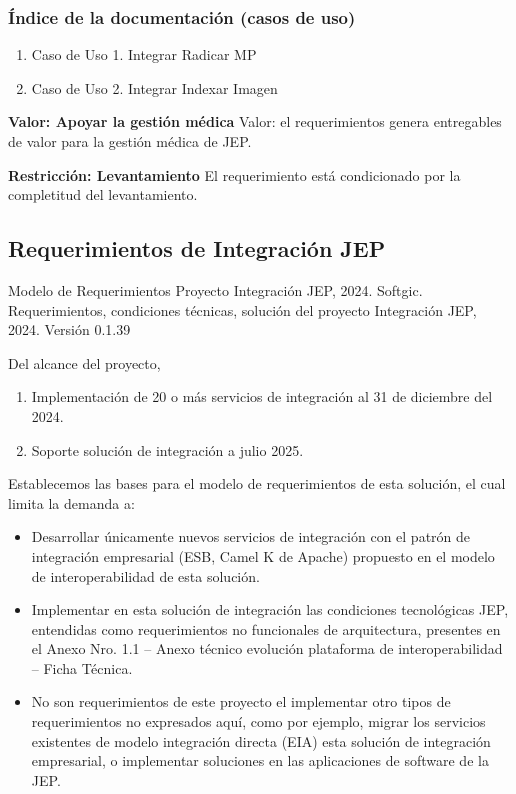 \documentclass[
  paper=a4,
  ,captions=tableheading
]{scrartcl}
\providecommand{\tightlist}{%
  \setlength{\itemsep}{0pt}\setlength{\parskip}{0pt}}
\renewenvironment{quote}{\begin{customblockquote}\list{}{\rightmargin=0em\leftmargin=0em}%
\item\relax\color{blockquote-text}\ignorespaces}{\unskip\unskip\endlist\end{customblockquote}}
\begin{document}
\subsubsection{Índice de la documentación (casos de
uso)}\label{sec:uxedndice-de-la-documentaciuxf3n-casos-de-uso-1}

\begin{enumerate}
\def\labelenumi{\arabic{enumi}.}
\tightlist
\item
  Caso de Uso 1. Integrar Radicar MP
\item
  Caso de Uso 2. Integrar Indexar Imagen
\end{enumerate}

\textbf{Valor: Apoyar la gestión médica} Valor: el requerimientos genera
entregables de valor para la gestión médica de JEP.

\textbf{Restricción: Levantamiento} El requerimiento está condicionado
por la completitud del levantamiento.

\subsection{Requerimientos de Integración
JEP}\label{sec:requerimientos-de-integraciuxf3n-jep-2}

\begin{quote}
Modelo de Requerimientos Proyecto Integración JEP, 2024. Softgic.
Requerimientos, condiciones técnicas, solución del proyecto Integración
JEP, 2024. Versión 0.1.39
\end{quote}

Del alcance del proyecto,

\begin{enumerate}
\def\labelenumi{\arabic{enumi}.}
\tightlist
\item
  Implementación de 20 o más servicios de integración al 31 de diciembre
  del 2024.
\item
  Soporte solución de integración a julio 2025.
\end{enumerate}

Establecemos las bases para el modelo de requerimientos de esta
solución, el cual limita la demanda a:

\begin{itemize}
\tightlist
\item
  Desarrollar únicamente nuevos servicios de integración con el patrón
  de integración empresarial (ESB, Camel K de Apache) propuesto en el
  modelo de interoperabilidad de esta solución.
\item
  Implementar en esta solución de integración las condiciones
  tecnológicas JEP, entendidas como requerimientos no funcionales de
  arquitectura, presentes en el Anexo Nro. 1.1 -- Anexo técnico
  evolución plataforma de interoperabilidad -- Ficha Técnica.
\item
  No son requerimientos de este proyecto el implementar otro tipos de
  requerimientos no expresados aquí, como por ejemplo, migrar los
  servicios existentes de modelo integración directa (EIA) esta solución
  de integración empresarial, o implementar soluciones en las
  aplicaciones de software de la JEP.
\end{itemize}
\end{document}
